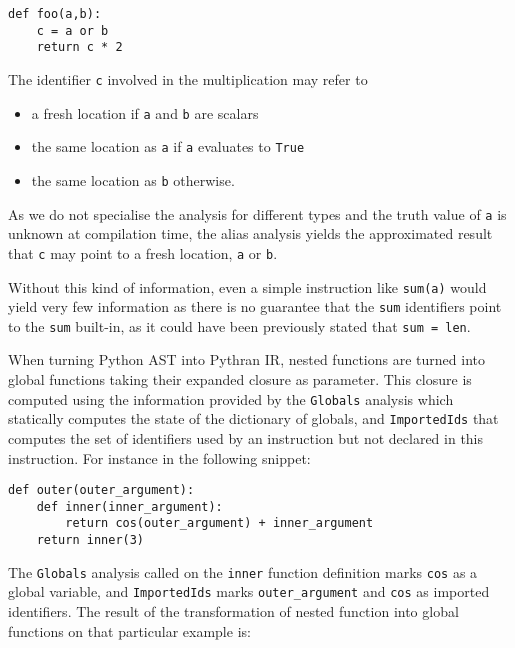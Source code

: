 \documentclass[10pt, onecolumn, preprint]{sigplanconf}
\begin{document}
\begin{lstlisting}
def foo(a,b):
    c = a or b
    return c * 2
\end{lstlisting}

The identifier \texttt{c} involved in the multiplication may refer to

\begin{itemize}
    \item a fresh location if \texttt{a} and \texttt{b} are scalars

    \item the same location as \texttt{a} if \texttt{a} evaluates to \texttt{True}

    \item the same location as \texttt{b} otherwise.

\end{itemize}

As we do not specialise the analysis for different types and the truth value of
\texttt{a} is unknown at compilation time, the alias analysis yields %
the approximated result that \texttt{c} may point to a fresh location, 
\texttt{a} or \texttt{b}.

Without this kind of information, even a simple instruction like
\texttt{sum(a)} would yield very few information as there is no guarantee that
the \texttt{sum} identifiers point to the \texttt{sum} built-in, as it could have been 
previously stated that \texttt{sum = len}.

When turning Python AST into Pythran IR, nested functions are turned into global
functions taking their expanded closure as parameter. This closure is computed 
using the information provided by the \texttt{Globals} analysis which 
statically computes the state of the dictionary of globals, and 
\texttt{ImportedIds} that computes the set of %
identifiers used by an instruction but not declared in this instruction. For
instance in the following snippet:

\begin{lstlisting}
def outer(outer_argument):
    def inner(inner_argument):
        return cos(outer_argument) + inner_argument
    return inner(3)
\end{lstlisting}

The \texttt{Globals} analysis called on the \texttt{inner} function definition
marks \texttt{cos} as a global variable, and \texttt{ImportedIds} marks
\texttt{outer\_argument} and \texttt{cos} as imported identifiers. The result
of the transformation of nested function into global functions on that
particular example is:
\end{document}
